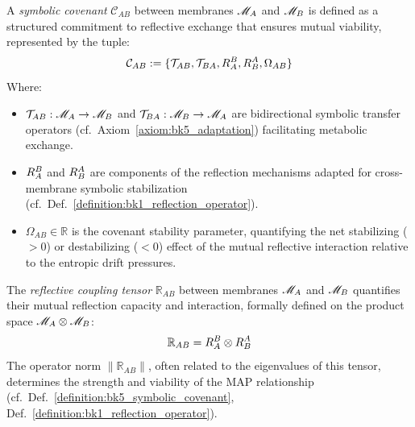 \begin{definition}
\label{definition:bk5_symbolic_covenant}
A \emph{symbolic covenant} $\mathcal{C}_{AB}$ between membranes $\mathscr{M}_A$ and $\mathscr{M}_B$ is defined as a structured commitment to reflective exchange that ensures mutual viability, represented by the tuple:
\begin{equation}
\mathcal{C}_{AB} := \{\mathcal{T}_{AB}, \mathcal{T}_{BA}, R_A^B, R_B^A, \Omega_{AB}\}
\end{equation}
Where:
\begin{itemize}
  \item $\mathcal{T}_{AB}: \mathscr{M}_A \to \mathscr{M}_B$ and $\mathcal{T}_{BA}: \mathscr{M}_B \to \mathscr{M}_A$ are bidirectional symbolic transfer operators (cf.~Axiom~\ref{axiom:bk5_adaptation}) facilitating metabolic exchange.
  \item $R_A^B$ and $R_B^A$ are components of the reflection mechanisms adapted for cross-membrane symbolic stabilization (cf.~Def.~\ref{definition:bk1_reflection_operator}).
  \item $\Omega_{AB} \in \mathbb{R}$ is the covenant stability parameter, quantifying the net stabilizing ($>0$) or destabilizing ($<0$) effect of the mutual reflective interaction relative to the entropic drift pressures.
\end{itemize}
\end{definition}
\begin{definition}
\label{definition:bk5_reflective_coupling_tens}
The \emph{reflective coupling tensor} $\mathbb{R}_{AB}$ between membranes $\mathscr{M}_A$ and $\mathscr{M}_B$ quantifies their mutual reflection capacity and interaction, formally defined on the product space $\mathscr{M}_A \otimes \mathscr{M}_B$:
\begin{equation}
\mathbb{R}_{AB} = R_A^B \otimes R_B^A
\end{equation}
The operator norm $\|\mathbb{R}_{AB}\|$, often related to the eigenvalues of this tensor, determines the strength and viability of the MAP relationship (cf.~Def.~\ref{definition:bk5_symbolic_covenant}, Def.~\ref{definition:bk1_reflection_operator}).
\end{definition}

